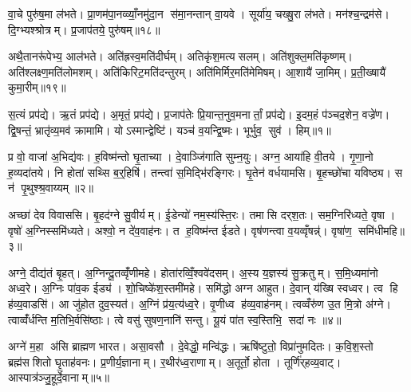 वा॒चे पुरु॑ष॒मा ल॑भते। प्रा॒णम॑पा॒नव्व्याँ॒नमु॑दा॒न स॑मा॒नन्तान् वा॒यवे। सूर्या॑य॒ चख्षु॒रा ल॑भते। मन॑श्च॒न्द्रम॑से। दि॒ग्भ्यश्श्रोत्रम्। प्र॒जाप॑तये॒ पुरु॑षम्॥१८॥

अथै॒तानरू॑पेभ्य॒ आल॑भते। अति॑ह्रस्व॒मति॑दीर्घम्। अतिकृ॑श॒मत्यसलम्। अति॑शुक्ल॒मति॑कृष्णम्। अति॑श्लक्ष्ण॒मति॑लोमशम्। अति॑किरिट॒मति॑दन्तुरम्। अति॑मिर्मिर॒मति॑मेमिषम्। आ॒शायै॑ जा॒मिम्। प्र॒ती॒ख्षायै॑ कुमा॒रीम्॥१९॥



\clearpage
{}
\setcounter{anuvakam}{0}
स॒त्यं प्रप॑द्ये। ऋ॒तं प्रप॑द्ये। अ॒मृतं॒ प्रप॑द्ये। प्र॒जाप॑तेः प्रि॒यान्त॒नुव॒मनार्तां॒ प्रप॑द्ये। इ॒दम॒हं प॑ञ्चद॒शेन॒ वज्रे॑ण। द्वि॒षन्तं॒ भ्रातृ॑व्य॒मव॑ क्रामामि। योऽस्मान्द्वेष्टि॑। यञ्च॑ व॒यन्द्वि॒ष्मः। भूर्भुव॒ सुव॑। हिम्॥१॥\anuvakamend[स॒त्यन्दश॑]

प्र वो॒ वाजा॑ अ॒भिद्य॑वः। ह॒विष्म॑न्तो घृ॒ताच्या। दे॒वाञ्जि॑गाति सुम्न॒युः। अग्न॒ आया॑हि वी॒तये। गृ॒णा॒नो ह॒व्यदा॑तये। नि होता॑ सथ्सि ब॒र्॒हिषि॑। तन्त्वा॑ स॒मिद्भि॑रङ्गिरः। घृ॒तेन॑ वर्धयामसि। बृ॒हच्छो॑चा यविष्ठ्य। स न॑ पृ॒थुश्श्र॒वाय्यम्॥२॥

अच्छा॑ देव विवाससि। बृ॒हद॑ग्ने सु॒वीर्यम्। ई॒डेन्यो॑ नम॒स्य॑स्ति॒रः। तमासि दर्‌श॒तः। सम॒ग्निरि॑ध्यते॒ वृषा। वृषो॑ अ॒ग्निस्समि॑ध्यते। अश्वो॒ न दे॑व॒वाह॑नः। त ह॒विष्म॑न्त ईडते। वृष॑णन्त्वा व॒यव्वृँषन्न्॑। वृषा॑ण॒ समि॑धीमहि॥३॥

अग्ने॒ दीद्य॑तं बृ॒हत्। अ॒ग्निन्दू॒तव्वृँ॑णीमहे। होता॑रव्विँ॒श्ववे॑दसम्। अ॒स्य य॒ज्ञस्य॑ सु॒क्रतुम्। स॒मि॒ध्यमा॑नो अध्व॒रे। अ॒ग्निः पा॑व॒क ईड्य॑। शो॒चिष्के॑श॒स्तमी॑महे। समि॑द्धो अग्न आहुत। दे॒वान् य॑ख्षि स्वध्वर। त्व हि ह॑व्य॒वाडसि॑। आ जु॑होत दुव॒स्यत॑। अ॒ग्निं प्र॑य॒त्य॑ध्व॒रे। वृ॒णीध्व ह॑व्य॒वाह॑नम्। त्वव्वँरु॑ण उ॒त मि॒त्रो अ॑ग्ने। त्वाव्वँ॑र्धन्ति म॒तिभि॒र्वसि॑ष्ठाः। त्वे वसु॑ सुषण॒नानि॑ सन्तु। यू॒यं पा॑त स्व॒स्तिभि॒ सदा॑ नः ॥४॥\anuvakamend[श्र॒वाय्य॑मिधीम॒ह्यसि॑ स॒प्त च॑]

अग्ने॑ म॒हा अ॑सि ब्राह्मण भारत। असा॒वसौ। दे॒वेद्धो॒ मन्वि॑द्धः। ऋषि॑ष्टुतो॒ विप्रा॑नुमदितः। क॒वि॒श॒स्तो ब्रह्म॑सशितो घृ॒ताह॑वनः। प्र॒णीर्य॒ज्ञानाम्। र॒थीर॑ध्व॒राणाम्। अ॒तूर्तो॒ होता। तूर्णि॑र्‌हव्य॒वाट्। आस्पात्र॑ञ्जु॒हूर्दे॒वानाम्॥५॥

